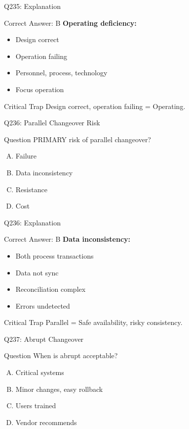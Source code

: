 \documentclass{beamer}
\begin{document}
	\begin{frame}{Q235: Explanation}
		\begin{block}{Correct Answer: B}
			\textbf{Operating deficiency:}
			\begin{itemize}
				\item Design correct
				\item Operation failing
				\item Personnel, process, technology
				\item Focus operation
			\end{itemize}
		\end{block}
		\begin{alertblock}{Critical Trap}
			Design correct, operation failing = Operating.
		\end{alertblock}
	\end{frame}
	
	\begin{frame}{Q236: Parallel Changeover Risk}
		\begin{block}{Question}
			PRIMARY risk of parallel changeover?
		\end{block}
		\begin{enumerate}[(A)]
			\item Failure
			\item Data inconsistency
			\item Resistance
			\item Cost
		\end{enumerate}
	\end{frame}
	
	\begin{frame}{Q236: Explanation}
		\begin{block}{Correct Answer: B}
			\textbf{Data inconsistency:}
			\begin{itemize}
				\item Both process transactions
				\item Data not sync
				\item Reconciliation complex
				\item Errors undetected
			\end{itemize}
		\end{block}
		\begin{alertblock}{Critical Trap}
			Parallel = Safe availability, risky consistency.
		\end{alertblock}
	\end{frame}
	
	\begin{frame}{Q237: Abrupt Changeover}
		\begin{block}{Question}
			When is abrupt acceptable?
		\end{block}
		\begin{enumerate}[(A)]
			\item Critical systems
			\item Minor changes, easy rollback
			\item Users trained
			\item Vendor recommends
		\end{enumerate}
	\end{frame}
	
\end{document}
